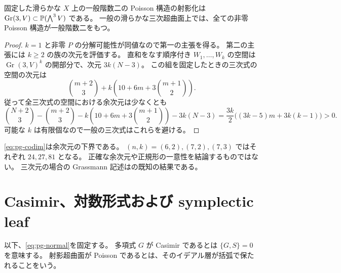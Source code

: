 \begin{corollary}\label{cor:pg-generic}
固定した滑らかな $X$ 上の一般階数二の Poisson 構造の射影化は
$\operatorname{Gr}(3,V)\subset\mathbb P(\bigwedge^3V)$ である。
一般の滑らかな三次超曲面上では、全ての非零 Poisson 構造が一般階数二をもつ。
\end{corollary}
\begin{proof}
$k=1$ と非零 $P$ の分解可能性が同値なので第一の主張を得る。
第二の主張には $k\geq2$ の族の次元を評価する。
直和をなす順序付き $W_1,\ldots,W_k$ の空間は
$\operatorname{Gr}(3,V)^k$ の開部分で、次元 $3k(N-3)$。
この組を固定したときの三次式の空間の次元は
\[
\binom{m+2}{3}+k\left(10+6m+3\binom{m+1}{2}\right).
\]
従って全三次式の空間における余次元は少なくとも
\begin{equation}
\binom{N+2}{3}-\binom{m+2}{3}
-k\left(10+6m+3\binom{m+1}{2}\right)-3k(N-3)
=\frac{3k}{2}\bigl((3k-5)m+3k(k-1)\bigr)>0.\label{eq:pg-codim}
\end{equation}
可能な $k$ は有限個なので一般の三次式はこれらを避ける。
\end{proof}
\begin{remark}
\eqref{eq:pg-codim}は余次元の下界である。
$(n,k)=(6,2),(7,2),(7,3)$ ではそれぞれ $24,27,81$ となる。
正確な余次元や正規形の一意性を結論するものではない。
三次元の場合の Grassmann 記述は\cite[Theorem 1]{PMayanskiy}の既知の結果である。
\end{remark}

\section{Casimir、対数形式および symplectic leaf}\label{sec:pg-leaves}
以下、\eqref{eq:pg-normal}を固定する。
多項式 $G$ が Casimir であるとは $\{G,S\}=0$ を意味する。
射影超曲面が Poisson であるとは、そのイデアル層が括弧で保たれることをいう。

